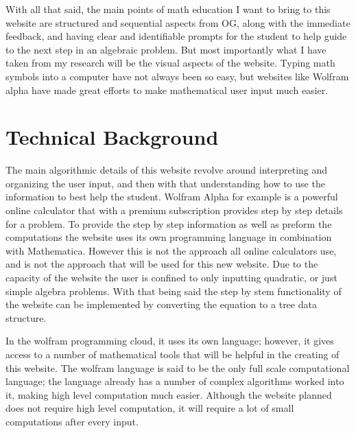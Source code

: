 \documentclass[10pt,twocolumn]{article}
\begin{document}
With all that said, the main points of math education I want to bring to this website are structured and sequential aspects from OG, along with the immediate feedback, and having clear and identifiable prompts for the student to help guide to the next step in an algebraic problem. But most importantly what I have taken from my research will be the visual aspects of the website. Typing math symbols into a computer have not always been so easy, but websites like Wolfram alpha have made great efforts to make mathematical user input much easier. 




\section{Technical Background}
The main algorithmic details of this website revolve around interpreting and organizing the user input, and then with that understanding how to use the information to best help the student. Wolfram Alpha for example is a powerful online calculator that with a premium subscription provides step by step details for a problem. To provide the step by step information as well as preform the computations the website uses its own programming language in combination with Mathematica. However this is not the approach all online calculators use, and is not the approach that will be used for this new website. Due to the capacity of the website the user is confined to only inputting quadratic, or just simple algebra problems. With that being said the step by stem functionality of the website can be implemented by converting the equation to a tree data structure.   

In the wolfram programming cloud, it uses its own language; however, it gives access to a number of mathematical tools that will be helpful in the creating of this website. The wolfram language is said to be the only full scale computational language; the language already has a number of complex algorithms worked into it, making high level computation much easier. Although the website planned does not require high level computation, it will require a lot of small computations after every input. 
\end{document}
